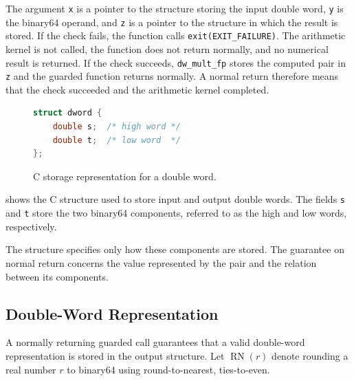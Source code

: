 The argument \texttt{x} is a pointer to the structure storing the input double
word, \texttt{y} is the binary64 operand, and \texttt{z} is a pointer to the
structure in which the result is stored.  If the check fails, the function
calls \texttt{exit(EXIT\_FAILURE)}.  The arithmetic kernel is not called, the
function does not return normally, and no numerical result is returned.  If
the check succeeds, \texttt{dw\_mult\_fp} stores the computed pair in
\texttt{z} and the guarded function returns normally.  A normal return
therefore means that the check succeeded and the arithmetic kernel completed.

\begin{figure}[t]
  \begin{lstlisting}[language=C]
struct dword {
    double s;  /* high word */
    double t;  /* low word  */
};
  \end{lstlisting}
  \caption{C storage representation for a double word.}
  \label{fig:dword-struct}
\end{figure}

 shows the C structure used to store input and output
double words.  The fields \texttt{s} and \texttt{t} store the two binary64
components, referred to as the high and low words, respectively.

The structure specifies only how these components are stored.  The guarantee
on normal return concerns the value represented by the pair and the relation
between its components.

\subsection{Double-Word Representation}
\label{sec:overview-values}

A normally returning guarded call guarantees that a valid double-word
representation is stored in the output structure.  Let
$\operatorname{RN}(r)$ denote rounding a real number $r$ to binary64 using
round-to-nearest, ties-to-even.



